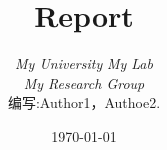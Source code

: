 \begin{titlepage}
    \title{Report}
    \author{
    \emph{My University} \emph{My Lab} \\
    \emph{My Research Group} \\[8cm]
    编写:Author1，Authoe2.
    }

    \date{\today}

    \maketitle
    \thispagestyle{empty}
\end{titlepage}
